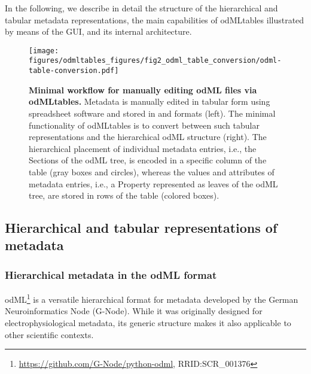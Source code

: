 In the following, we describe in detail the structure of the hierarchical and tabular metadata representations, the main capabilities of odMLtables illustrated by means of the GUI, and its internal architecture. 


\begin{figure}[h!]
\begin{center}
\texttt{[image: figures/odmltables\_figures/fig2\_odml\_table\_conversion/odml-table-conversion.pdf]}
\caption{{\label{fig:min_workflow}
\textbf{Minimal workflow for manually editing odML files via odMLtables.} Metadata is manually edited in tabular form using spreadsheet software and stored in  and  formats (left). The minimal functionality of odMLtables is to convert between such tabular representations and the hierarchical odML structure (right). The hierarchical placement of individual metadata entries, i.e., the Sections of the odML tree, is encoded in a specific column of the table (gray boxes and circles), whereas the values and attributes of metadata entries, i.e., a Property represented as leaves of the odML tree, are stored in rows of the table (colored boxes).%
}}
\end{center}
\end{figure}

\subsection{Hierarchical and tabular representations of metadata}
\label{sec:Hierarchical-Tabular}

\subsubsection{Hierarchical metadata in the odML format}
\label{sec:subodML}

odML\footnote{\url{https://github.com/G-Node/python-odml}, RRID:SCR\_001376} is a versatile hierarchical format for metadata \citep{Grewe_2011} developed by the German Neuroinformatics Node (G-Node). While it was originally designed for electrophysiological metadata, its generic structure makes it also applicable to other scientific contexts.

